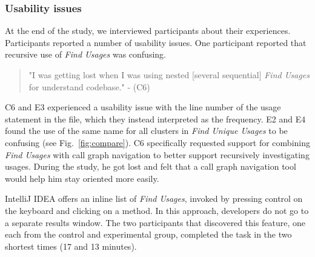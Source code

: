 \documentclass[conference]{IEEEtran}
\begin{document}
\subsubsection{Usability issues}
At the end of the study, we interviewed  participants about their experiences. Participants reported a number of usability issues. One participant reported that recursive use of \textit{Find Usages} was confusing. 
\begin{quote} "I was getting lost when I was using nested [several sequential] \textit{Find Usages} for understand codebase." - (C6)\end{quote}
\noindent C6 and E3 experienced a usability issue with the line number of the usage statement in the file, which they instead interpreted as the frequency.
E2 and E4 found the use of the same name for all clusters in \textit{Find Unique Usages} to be confusing (see Fig.~\ref{fig:compare}). 
C6 specifically requested support for combining \textit{Find Usages} with call graph navigation to better support recursively investigating usages. During the study, he got lost and felt that a call graph navigation tool would help him stay oriented more easily.\par


IntelliJ IDEA offers an inline list of \textit{Find Usages}, invoked by pressing control on the keyboard and clicking on a method. In this approach, developers do not go to a separate results window. The two participants that discovered this feature, one each from the control and experimental group, completed the task in the two shortest times (17 and 13 minutes).

\end{document}

